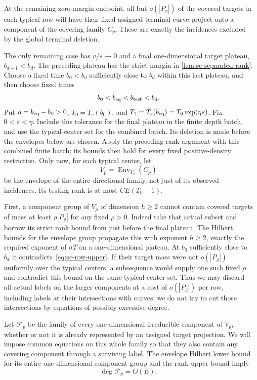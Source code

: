 At the remaining zero-margin endpoint, all but $o(|P_y|)$ of the covered targets in each typical row will have their fixed assigned terminal curve project onto a component of the covering family $C_p$.  These are exactly the incidences excluded by the global terminal deletion.

The only remaining case has $v/s\to0$ and a final one-dimensional target plateau, $b_{d-1}<b_d$.  The preceding plateau has the strict margin in \cref{lem:sc-separated-rank}.  Choose a fixed time $b_0<b_d$ sufficiently close to $b_d$ within this last plateau, and then choose fixed times
\[
 b_0<b_{\rm eq}<b_{\rm test}<b_d.
\]
Put $\eta=b_{\rm eq}-b_0>0$, $T_0=T_s(b_0)$, and $T_1=T_s(b_{\rm eq})=T_0\exp(\eta s)$.  Fix $0<\varepsilon<\eta$. Include this tolerance for the final plateau in the finite depth batch, and use the typical-center set for the combined batch.  Its deletion is made before the envelopes below are chosen.  Apply the preceding rank argument with this combined finite batch; its bounds then hold for every fixed positive-density restriction.  Only now, for each typical center, let
\[
 V_p=\operatorname{Env}_{T_0}(C_p)
\]
be the envelope of the entire directional family, not just of its observed incidences.  Its testing rank is at most $CE(T_0+1)$.

First, a component group of $V_p$ of dimension $h\ge2$ cannot contain covered targets of mass at least $\rho|P_y|$ for any fixed $\rho>0$.  Indeed take that actual subset and borrow its strict rank bound from just before the final plateau.  The Hilbert bounds for the envelope group propagate this with exponent $h\ge2$, exactly the required exponent of $\sigma T$ on a one-dimensional plateau.  At $b_0$ sufficiently close to $b_d$ it contradicts~\eqref{eq:sc-row-upper}. If their target mass were not $o(|P_y|)$ uniformly over the typical centers, a subsequence would supply one such fixed $\rho$ and contradict this bound on the same typical-center set.  Thus we may discard all actual labels on the larger components at a cost of $o(|P_y|)$ per row, including labels at their intersections with curves; we do not try to cut those intersections by equations of possibly excessive degree.

Let $\mathcal{F}_p$ be the family of every one-dimensional irreducible component of $V_p$, whether or not it is already represented by an assigned target projection.  We will impose common equations on this whole family so that they also contain any covering component through a surviving label.  The envelope Hilbert lower bound for its entire one-dimensional component group and the rank upper bound imply
\begin{equation}\label{eq:sc-last-family-degree}
 \deg\mathcal{F}_p=O(E).
\end{equation}

